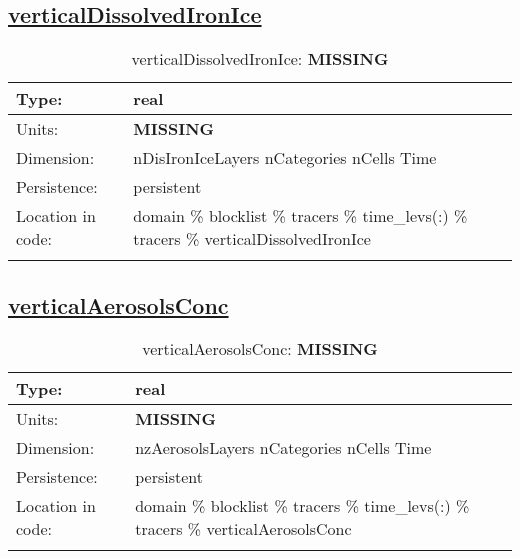 \subsection[verticalDissolvedIronIce]{\hyperref[sec:var_tab_tracers]{verticalDissolvedIronIce}}
\label{subsec:var_sec_tracers_verticalDissolvedIronIce}
\begin{center}
\begin{longtable}{| p{2.0in} | p{4.0in} |}
        \hline 
        Type: & real \\
        \hline 
        Units: & {\bf \color{red} MISSING} \\
        \hline 
        Dimension: & nDisIronIceLayers nCategories nCells Time \\
        \hline 
        Persistence: & persistent \\
        \hline 
         Location in code: & domain \% blocklist \% tracers \% time\_levs(:) \% tracers \% verticalDissolvedIronIce \\
         \hline 
    \caption{verticalDissolvedIronIce: {\bf \color{red} MISSING}}
\end{longtable}
\end{center}
\subsection[verticalAerosolsConc]{\hyperref[sec:var_tab_tracers]{verticalAerosolsConc}}
\label{subsec:var_sec_tracers_verticalAerosolsConc}
\begin{center}
\begin{longtable}{| p{2.0in} | p{4.0in} |}
        \hline 
        Type: & real \\
        \hline 
        Units: & {\bf \color{red} MISSING} \\
        \hline 
        Dimension: & nzAerosolsLayers nCategories nCells Time \\
        \hline 
        Persistence: & persistent \\
        \hline 
         Location in code: & domain \% blocklist \% tracers \% time\_levs(:) \% tracers \% verticalAerosolsConc \\
         \hline 
    \caption{verticalAerosolsConc: {\bf \color{red} MISSING}}
\end{longtable}
\end{center}
